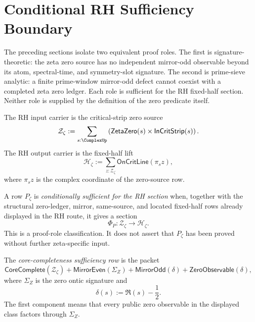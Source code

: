 \section{Conditional RH Sufficiency Boundary}
\label{sec:unified-reality-conditional-rh-sufficiency-boundary}

The preceding sections isolate two equivalent proof roles.  The first is
signature-theoretic: the zeta zero source has no independent
mirror-odd observable beyond its atom, spectral-time, and symmetry-slot
signature.  The second is prime-sieve analytic: a finite prime-window
mirror-odd defect cannot coexist with a completed zeta zero ledger.  Each
role is sufficient for the RH fixed-half section.  Neither role is
supplied by the definition of the zero predicate itself.

\begin{definition}
\label{def:unified-reality-rh-input-zero-source}
The RH input carrier is the critical-strip zero source
$$
\mathcal Z_{\zeta}
:=
\sum_{s:\ComplexUp}
\left(
\mathsf{ZetaZero}(s)
\times
\mathsf{InCritStrip}(s)
\right).
$$
The RH output carrier is the fixed-half lift
$$
\mathcal H_{\zeta}
:=
\sum_{z:\mathcal Z_{\zeta}}
\mathsf{OnCritLine}(\pi_s z),
$$
where $\pi_s z$ is the complex coordinate of the zero-source row.
\end{definition}

\begin{definition}
\label{def:unified-reality-conditional-sufficiency-row}
A row $P_{\zeta}$ is \emph{conditionally sufficient for the RH section}
when, together with the structural zero-ledger, mirror, same-source, and
located fixed-half rows already displayed in the RH route, it gives a
section
$$
\Phi_{P}:
\mathcal Z_{\zeta}\to\mathcal H_{\zeta}.
$$
This is a proof-role classification.  It does not assert that
$P_{\zeta}$ has been proved without further zeta-specific input.
\end{definition}

\begin{definition}
\label{def:unified-reality-core-completeness-sufficiency-row}
The \emph{core-completeness sufficiency row} is the packet
$$
\mathsf{CoreComplete}(\mathcal Z_{\zeta})
+
\mathsf{MirrorEven}(\Sigma_Z)
+
\mathsf{MirrorOdd}(\delta)
+
\mathsf{ZeroObservable}(\delta),
$$
where $\Sigma_Z$ is the zero ontic signature and
$$
\delta(s):=\Re(s)-\frac12.
$$
The first component means that every public zero observable in the
displayed class factors through $\Sigma_Z$.
\end{definition}

